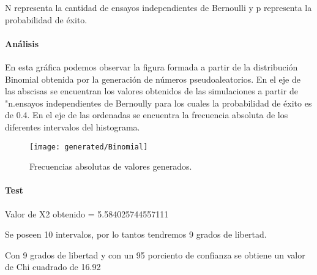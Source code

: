 \documentclass{article}
\begin{document}
  N representa la cantidad de ensayos independientes de Bernoulli y p representa la probabilidad de éxito.

  \paragraph{Análisis\newline}
  En esta gráfica podemos observar la figura formada a partir de la distribución Binomial obtenida por la generación de
  números pseudoaleatorios. En el eje de las abscisas se
  encuentran los valores obtenidos de las simulaciones a partir de "n.ensayos independientes de Bernoully para los cuales
  la probabilidad de éxito es de 0.4. En el eje de las ordenadas se encuentra la frecuencia absoluta de los diferentes intervalos del
  histograma.
  \begin{figure}[h]
    \centering
    \texttt{[image: generated/Binomial]}
    \caption{Frecuencias absolutas de valores generados.}
  \end{figure}

  \paragraph{Test\newline}

  Valor de X2 obtenido = 5.584025744557111

  Se poseen 10 intervalos, por lo tantos tendremos 9 grados de libertad.

  Con 9 grados de libertad y con un 95 porciento de confianza se obtiene un valor de Chi cuadrado de 16.92
\end{document}

